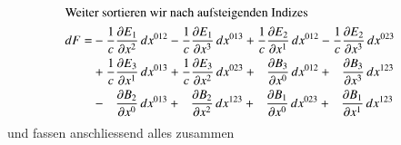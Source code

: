 \begin{align*}
	\\
	\intertext{Weiter sortieren wir nach aufsteigenden Indizes}
	dF =
	&- \frac{1}{c} \frac{\d E_1}{\d x^2} \, dx^{012} - \frac{1}{c} \frac{\d E_1}{\d x^3} \, dx^{013}
	 + \frac{1}{c} \frac{\d E_2}{\d x^1} \, dx^{012} - \frac{1}{c} \frac{\d E_2}{\d x^3} \, dx^{023}
	\\
	&+ \frac{1}{c} \frac{\d E_3}{\d x^1} \, dx^{013} + \frac{1}{c} \frac{\d E_3}{\d x^2} \, dx^{023}
	 + \phantom{\frac{1}{c}} \frac{\d B_3}{\d x^0} \, dx^{012} + \phantom{\frac{1}{c}} \frac{\d B_3}{\d x^3} \, dx^{123}
	\\
	&- \phantom{\frac{1}{c}} \frac{\d B_2}{\d x^0} \, dx^{013} + \phantom{\frac{1}{c}} \frac{\d B_2}{\d x^2} \, dx^{123}
	 + \phantom{\frac{1}{c}} \frac{\d B_1}{\d x^0} \, dx^{023} + \phantom{\frac{1}{c}} \frac{\d B_1}{\d x^1} \, dx^{123}
\end{align*}
und fassen anschliessend alles zusammen
